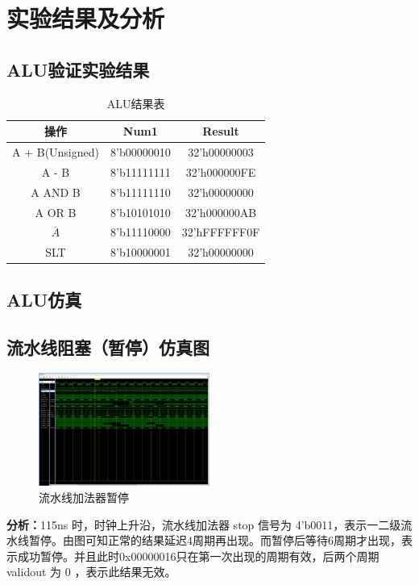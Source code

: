 \section{实验结果及分析}
\subsection{ALU验证实验结果}
\begin{table}[htbp]
    \centering
    \begin{tabular}{c|c|c}
        操作            &	Num1        &	Result\\
        \hline
        A + B(Unsigned) &	8'b00000010 &32'h00000003 	\\
        A - B           &	8'b11111111 &32'h000000FE	\\
        A AND B         &	8'b11111110 &32'h00000000	\\
        A OR B          &	8'b10101010 &32'h000000AB	\\
        $\overline{A}$  &	8'b11110000 &32'hFFFFFF0F	\\
        SLT             &	8'b10000001 &32'h00000000	\\
        \hline
    \end{tabular}
    \caption{ALU结果表}
    \label{tab:my_label}
\end{table}
\subsection{ALU仿真}
\subsection{流水线阻塞（暂停）仿真图}
\begin{figure}[htbp]
    \centering
    \includegraphics[width=0.5\textwidth]{image/177.png}
    \caption{流水线加法器暂停}
    \label{fig:my_label}
\end{figure}

\textbf{分析：}115ns 时，时钟上升沿，流水线加法器 stop 信号为 4'b0011，表示一二级流水线暂停。由图可知正常的结果延迟4周期再出现。而暂停后等待6周期才出现，表示成功暂停。并且此时0x00000016只在第一次出现的周期有效，后两个周期 validout 为 0 ，表示此结果无效。
